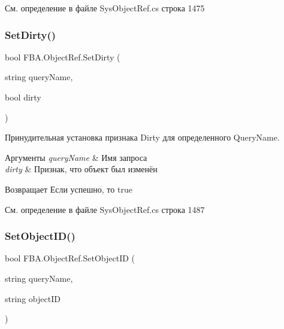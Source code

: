 См. определение в файле Sys\+Object\+Ref.\+cs строка 1475

\mbox{\label{class_f_b_a_1_1_object_ref_acf05bfdc57a547fb141b8989a264232f}} 
\subsubsection{\texorpdfstring{Set\+Dirty()}{SetDirty()}}
{\footnotesize\ttfamily bool F\+B\+A.\+Object\+Ref.\+Set\+Dirty (\begin{DoxyParamCaption}\item[{string}]{query\+Name,  }\item[{bool}]{dirty }\end{DoxyParamCaption})}



Принудительная установка признака Dirty для определенного Query\+Name. 


\begin{DoxyParams}{Аргументы}
{\em query\+Name} & Имя запроса\\
\hline
{\em dirty} & Признак, что объект был изменён\\
\hline
\end{DoxyParams}
\begin{DoxyReturn}{Возвращает}
Если успешно, то true
\end{DoxyReturn}


См. определение в файле Sys\+Object\+Ref.\+cs строка 1487

\mbox{\label{class_f_b_a_1_1_object_ref_a2d131ae4fda915ff9179cc02e30c76d8}} 
\subsubsection{\texorpdfstring{Set\+Object\+I\+D()}{SetObjectID()}}
{\footnotesize\ttfamily bool F\+B\+A.\+Object\+Ref.\+Set\+Object\+ID (\begin{DoxyParamCaption}\item[{string}]{query\+Name,  }\item[{string}]{object\+ID }\end{DoxyParamCaption})}



